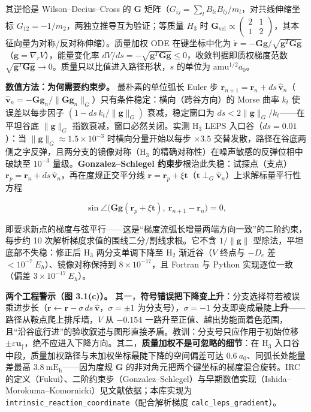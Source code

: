 \documentclass[
]{ctexbook}
\begin{document}
其逆恰是 Wilson--Decius--Cross 的 \(\mathbf{G}\)
矩阵（\(G_{ij}=\sum_l B_{li}B_{lj}/m_l\)，对共线伸缩坐标
\(G_{12}=-1/m_2\)，两独立推导互为验证；等质量 \(H_3\) 时
\(\mathbf{G}_{\mathrm{vel}}\propto\begin{pmatrix}2&1\\1&2\end{pmatrix}\)，其本征向量为对称/反对称伸缩）。质量加权
ODE 在键坐标中化为
\(\dot{\mathbf{r}}=-\mathbf{G}\mathbf{g}/\sqrt{\mathbf{g}^{T}\mathbf{G}\mathbf{g}}\)（\(\mathbf{g}=\nabla_r V\)），能量变化率
\(dV/ds=-\sqrt{\mathbf{g}^{T}\mathbf{G}\mathbf{g}}\le0\)，收敛判据即质权梯度范数
\(\sqrt{\mathbf{g}^{T}\mathbf{G}\mathbf{g}}\to0\)。质量只以比值进入路径形状，\(s\)
的单位为 \(\mathrm{amu}^{1/2}a_0\)。

\textbf{数值方法：为何需要约束步。} 最朴素的单位弧长 Euler 步
\(\mathbf{r}_{n+1}=\mathbf{r}_n+ds\,\hat{\mathbf{v}}_n\)（\(\hat{\mathbf{v}}_n=-\mathbf{G}\mathbf{g}_n/\lVert\mathbf{G}\mathbf{g}_n\rVert_{G}\)）只有条件稳定：横向（跨谷方向）的
Morse 曲率 \(k_t\) 使误差以每步因子
\((1-ds\,k_t/\lVert\mathbf{g}\rVert_G)\) 衰减，稳定窗口为
\(ds<2\lVert\mathbf{g}\rVert_G/k_t\)------在平坦谷底
\(\lVert\mathbf{g}\rVert_G\) 指数衰减，窗口必然关闭。实测
\(\mathrm{H}_3\) LEPS 入口谷（\(ds=0.01\)）：当
\(\lVert\mathbf{g}\rVert_G\approx1.5\times10^{-3}\) 时横向分量开始以每步
\(\times3.5\)
交替发散，路径在谷底两侧之字反弹，且两分支的镜像对称（\(\mathrm{H}_3\)
的精确对称性）在噪声敏感的反弹位相中破缺至 \(10^{-3}\)
量级。\textbf{Gonzalez--Schlegel
约束步}根治此失稳：试探点（支点）\(\mathbf{r}_p=\mathbf{r}_n+ds\,\hat{\mathbf{v}}_n\)，再在度规正交平分线
\(\mathbf{r}=\mathbf{r}_p+\xi\mathbf{t}\)（\(\mathbf{t}\perp_G\hat{\mathbf{v}}_n\)）上求解标量平行性方程

\[\sin\angle\bigl(\mathbf{G}\mathbf{g}(\mathbf{r}_p+\xi\mathbf{t}),\ \mathbf{r}_{n+1}-\mathbf{r}_n\bigr)=0,\]

即要求新点的梯度与弦平行------这是``梯度流弧长增量两端方向一致''的二阶约束，每步约
10 次解析梯度求值的围线二分/割线求根。它不含
\(1/\lVert\mathbf{g}\rVert\) 型除法，平坦底部不失稳：修正后
\(\mathrm{H}_3\) 两分支单调下降至 \(\mathrm{H}_2\) 渐近谷（\(V\) 终点与
\(-D_e\) 差 \(<10^{-7}\ E_h\)）、镜像对称保持到 \(8\times10^{-17}\)，且
Fortran 与 Python 实现逐位一致（偏差 \(3\times10^{-17}\ E_h\)）。

\textbf{两个工程警示（图 3.1(c)）。}
其一，\textbf{符号错误把下降变上升}：分支选择符若被误乘进步长（\(\mathbf{r}\leftarrow\mathbf{r}-\sigma\,ds\,\hat{\mathbf{v}}\)，\(\sigma=\pm1\)
为分支号），\(\sigma=-1\)
分支即变成最陡\textbf{上升}------路径从鞍点爬上排斥墙，\(V\) 从
\(-0.154\)
一路升至正值、越出势能面着色范围，且``沿谷底行进''的验收叙述与图形直接矛盾。教训：分支号只应作用于初始位移
\(\pm\varepsilon\mathbf{u}_{\ddagger}\)，绝不应进入下降方向。其二，\textbf{质量加权不是可忽略的细节}：在
\(\mathrm{H}_3\)
入口谷中段，质量加权路径与未加权坐标最陡下降的空间偏差可达
\(0.6\ a_0\)、同弧长处能量差最高 \(3.8\ \mathrm{mE_h}\)------因为度规
\(\mathbf{G}\) 的非对角元把两个键坐标的梯度混合旋转。IRC
的定义（Fukui）、二阶约束步（Gonzalez--Schlegel）与早期数值实现（Ishida--Morokuma--Komornicki）见文献依据；本库实现为
\texttt{intrinsic\_reaction\_coordinate}（配合解析梯度
\texttt{calc\_leps\_gradient}）。
\end{document}

